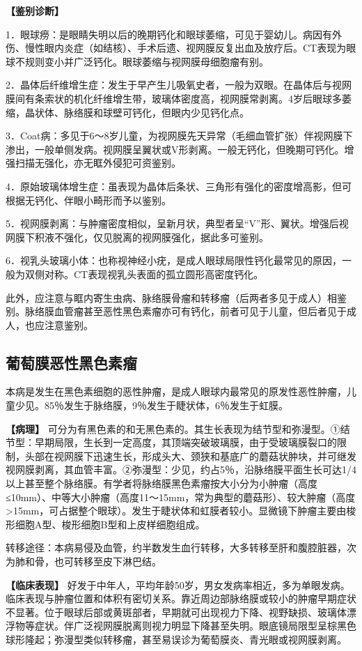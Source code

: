 \textbf{【鉴别诊断】}

1．眼球痨：是眼睛失明以后的晚期钙化和眼球萎缩，可见于婴幼儿。病因有外伤、慢性眼内炎症（如结核）、手术后遗、视网膜反复出血及放疗后。CT表现为眼球不规则变小并广泛钙化。眼球萎缩与视网膜母细胞瘤有别。

2．晶体后纤维增生症：发生于早产生儿吸氧史者，一般为双眼。在晶体后与视网膜间有条索状的机化纤维增生带，玻璃体密度高，视网膜常剥离。4岁后眼球多萎缩，晶状体、脉络膜和球壁可钙化，但眼内少见钙化点。

3．Coat病：多见于6～8岁儿童，为视网膜先天异常（毛细血管扩张）伴视网膜下渗出，一般单侧发病。视网膜呈翼状或V形剥离。一般无钙化，但晚期可钙化。增强扫描无强化，亦无眶外侵犯可资鉴别。

4．原始玻璃体增生症：虽表现为晶体后条状、三角形有强化的密度增高影，但可根据无钙化、伴眼小畸形而予以鉴别。

5．视网膜剥离：与肿瘤密度相似，呈新月状，典型者呈“V”形、翼状。增强后视网膜下积液不强化，仅见脱离的视网膜强化，据此多可鉴别。

6．视乳头玻璃小体：也称视神经小疣，是成人眼球局限性钙化最常见的原因，一般为双侧对称。CT表现视乳头表面的孤立圆形高密度钙化。

此外，应注意与眶内寄生虫病、脉络膜骨瘤和转移瘤（后两者多见于成人）相鉴别。脉络膜血管瘤甚至恶性黑色素瘤亦可有钙化，前者可见于儿童，但后者见于成人，也应注意鉴别。

\subsection{葡萄膜恶性黑色素瘤}

本病是发生在黑色素细胞的恶性肿瘤，是成人眼球内最常见的原发性恶性肿瘤，儿童少见。85％发生于脉络膜，9％发生于睫状体，6％发生于虹膜。

\textbf{【病理】}
可分为有黑色素的和无黑色素的。其生长表现为结节型和弥漫型。①结节型：早期局限，生长到一定高度，其顶端突破玻璃膜，由于受玻璃膜裂口的限制，头部在视网膜下迅速生长，形成头大、颈狭和基底广的蘑菇状肿块，并可继发视网膜剥离，其血管丰富。②弥漫型：少见，约占5％，沿脉络膜平面生长可达1/4以上甚至整个脉络膜。有学者将脉络膜黑色素瘤按大小分为小肿瘤（高度≤10mm）、中等大小肿瘤（高度11～15mm，常为典型的蘑菇形）、较大肿瘤（高度\textgreater{}15mm，可占据整个眼球）。发生于睫状体和虹膜者较小。显微镜下肿瘤主要由梭形细胞A型、梭形细胞B型和上皮样细胞组成。

转移途径：本病易侵及血管，约半数发生血行转移，大多转移至肝和腹腔脏器，次为肺和骨，也可转移至皮下淋巴结。

\textbf{【临床表现】}
好发于中年人，平均年龄50岁，男女发病率相近，多为单眼发病。临床表现与肿瘤位置和体积有密切关系。靠近周边部脉络膜或较小的肿瘤早期症状不显著。位于眼球后部或黄斑部者，早期就可出现视力下降、视野缺损、玻璃体漂浮物等症状。伴广泛视网膜脱离则视力明显下降甚至失明。眼底镜局限型呈棕黑色球形隆起；弥漫型类似转移瘤，甚至易误诊为葡萄膜炎、青光眼或视网膜剥离。

